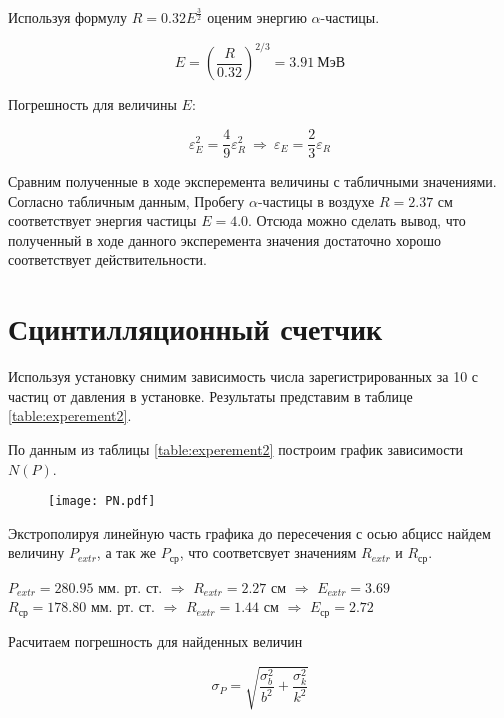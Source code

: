     Используя формулу $R = 0.32 E^{\frac{3}{2}}$ оценим энергию $\alpha$-частицы.

    \[ E = \left(\frac{R}{0.32} \right)^{2/3} = 3.91 ~ \text{МэВ} \]

    Погрешность для величины $E$:

    \[ \varepsilon_E^2 = \frac{4}{9} \varepsilon_R^2 ~ \Rightarrow ~ \varepsilon_E = \frac{2}{3} \varepsilon_R \]

    Сравним полученные в ходе эксперемента величины с табличными значениями. Согласно табличным данным,
    Пробегу $\alpha$-частицы в воздухе $R = 2.37$ см соответствует энергия частицы $E = 4.0$. Отсюда
    можно сделать вывод, что полученный в ходе данного эксперемента значения достаточно хорошо соответствует 
    действительности.

    \section*{Сцинтилляционный счетчик}

    Используя установку снимим зависимость числа зарегистрированных за 10 с частиц от давления в установке.
    Результаты представим в таблице \ref{table:experement2}.

    

    По данным из таблицы \ref{table:experement2} построим график зависимости $N(P)$.

    \begin{figure}
        \centering
        \texttt{[image: PN.pdf]}
        \caption{}
        \label{fig:plot2}
    \end{figure}

    Экстрополируя линейную часть графика до пересечения с осью абцисс найдем величину $P_{extr}$, а так же
    $P_{\text{ср}}$, что соответсвует значениям $R_{extr}$ и $R_{\text{ср}}$.

    \begin{center}
        $P_{extr} = 280.95$ мм. рт. ст. $\Rightarrow$ $R_{extr} = 2.27$ см $\Rightarrow$ $E_{extr} = 3.69$\\
        $R_{\text{ср}} = 178.80$ мм. рт. ст. $\Rightarrow$ $R_{extr} = 1.44$ см $\Rightarrow$ $E_{\text{ср}}  = 2.72$
    \end{center}

    Расчитаем погрешность для найденных величин

    \[ \sigma_P = \sqrt{\frac{\sigma_b^2}{b^2} + \frac{\sigma_k^2}{k^2}} \]
